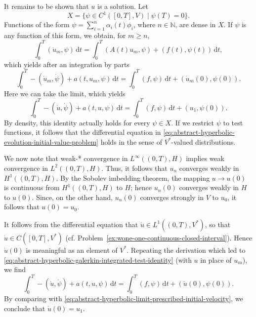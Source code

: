 It remains to be shown that $u$ is a solution. Let
\begin{equation}\label{eq:abstract-hyperbolic-terminal-zero-test-space}
X=\{\psi\in C^1([0,T],V)\mid\psi(T)=0\}.
\end{equation}
Functions of the form $\psi=\sum_{i=1}^n\alpha_i(t)\phi_i$, where $n\in\mathbb{N}$, are dense in $X$. If $\psi$ is any function of this form, we obtain, for $m\geq n$,
\begin{equation}\label{eq:abstract-hyperbolic-galerkin-test-identity}
\int_0^T(\ddot u_m,\psi)\,\mathrm{d}t=\int_0^T(A(t)u_m,\psi)+(f(t),\psi(t))\,\mathrm{d}t,
\end{equation}
which yields after an integration by parts
\begin{equation}\label{eq:abstract-hyperbolic-galerkin-integrated-test-identity}
\int_0^T-(\dot u_m,\dot\psi)+a(t,u_m,\psi)\,\mathrm{d}t=\int_0^T(f,\psi)\,\mathrm{d}t+(\dot u_m(0),\psi(0)).
\end{equation}
Here we can take the limit, which yields
\begin{equation}\label{eq:abstract-hyperbolic-limit-prescribed-initial-velocity}
\int_0^T-(\dot u,\dot\psi)+a(t,u,\psi)\,\mathrm{d}t=\int_0^T(f,\psi)\,\mathrm{d}t+(u_1,\psi(0)).
\end{equation}
By density, this identity actually holds for every $\psi\in X$. If we restrict $\psi$ to test functions, it follows that the differential equation in \eqref{eq:abstract-hyperbolic-evolution-initial-value-problem} holds in the sense of $V^*$-valued distributions.\par We now note that weak-* convergence in $L^\infty((0,T),H)$ implies weak convergence in $L^2((0,T),H)$. Thus, it follows that $u_n$ converges weakly in $H^1((0,T),H)$. By the Sobolev imbedding theorem, the mapping $u\to u(0)$ is continuous from $H^1((0,T),H)$ to $H$; hence $u_n(0)$ converges weakly in $H$ to $u(0)$. Since, on the other hand, $u_n(0)$ converges strongly in $V$ to $u_0$, it follows that $u(0)=u_0$.

It follows from the differential equation that $\ddot u\in L^1((0,T),V^*)$, so that $\dot u\in C([0,T],V^*)$ (cf. Problem~\ref{ex:wone-one-continuous-closed-interval}). Hence $\dot u(0)$ is meaningful as an element of $V^*$. Repeating the derivation which led to \eqref{eq:abstract-hyperbolic-galerkin-integrated-test-identity} (with $u$ in place of $u_m$), we find
\begin{equation}\label{eq:abstract-hyperbolic-limit-solution-initial-velocity}
\int_0^T-(\dot u,\dot\psi)+a(t,u,\psi)\,\mathrm{d}t=\int_0^T(f,\psi)\,\mathrm{d}t+(\dot u(0),\psi(0)).
\end{equation}
By comparing with \eqref{eq:abstract-hyperbolic-limit-prescribed-initial-velocity}, we conclude that $\dot u(0)=u_1$.

